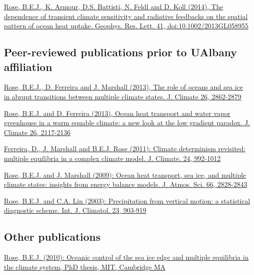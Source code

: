 \documentclass[11pt, letterpaper]{article} %
\newcommand{\years}[1]{\marginnote{\scriptsize #1}} %
\newcommand{\publink}{http://www.atmos.albany.edu/facstaff/brose/resources/Publications/}
\begin{document}
\years{2014}  
\href{\publink Rose_etal_GRL2014.pdf}{\underline{Rose, B.E.J.}, K. Armour, D.S. Battisti, N. Feldl and D. Koll (2014), The dependence of transient climate sensitivity and radiative feedbacks on the spatial pattern of ocean heat uptake. Geophys. Res. Lett. 41, doi:10.1002/2013GL058955}
  
\subsection*{Peer-reviewed publications prior to UAlbany affiliation} 
 
\years{2013}  
\href{\publink Rose_etal_transitions_JClim2013.pdf}{\underline{Rose, B.E.J.}, D. Ferreira and J. Marshall (2013), The role of oceans and sea ice in abrupt transitions between multiple climate states. J. Climate 26, 2862-2879}
\vspace{0.2 cm}

\href{\publink Rose_Ferreira_JClim2013.pdf}{\underline{Rose, B.E.J.} and D. Ferreira (2013), Ocean heat transport and water vapor greenhouse in a warm equable climate: a new look at the low gradient paradox. J. Climate 26, 2117-2136}
\vspace{0.2 cm}

\years{2011}  
\href{\publink FMR_JClim2011_MultipleEq.pdf}{Ferreira, D., J. Marshall and \underline{B.E.J. Rose} (2011): Climate determinism revisited: multiple equilibria in a complex climate model. J. Climate. 24, 992-1012}
\vspace{0.2 cm}
  
\years{2009}  
\href{\publink Rose_Marshall_JAS2009.pdf}{\underline{Rose, B.E.J.} and J. Marshall (2009): Ocean heat transport, sea ice, and multiple climate states: insights from energy balance models. J. Atmos. Sci. 66, 2828-2843}
\vspace{0.2 cm}
  
\years{2003}  
\href{\publink Rose_Lin_2003.pdf}{\underline{Rose, B.E.J.} and C.A. Lin (2003): Precipitation from vertical motion: a statistical diagnostic scheme. Int. J. Climatol. 23, 903-919}


\subsection*{Other publications}
\years{2010}  
\href{\publink Rose_PhD_2010.pdf}{\underline{Rose, B.E.J.} (2010): Oceanic control of the sea ice edge and multiple equilibria in the climate system, PhD thesis, MIT, Cambridge MA}
\vspace{0.2 cm}
\end{document}
